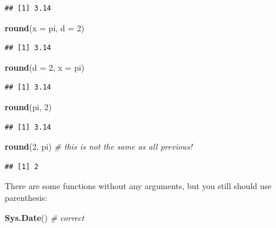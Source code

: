 \documentclass[
]{book}
\newenvironment{Shaded}{\begin{snugshade}}{\end{snugshade}}
\newcommand{\CommentTok}[1]{\textcolor[rgb]{0.56,0.35,0.01}{\textit{#1}}}
\newcommand{\DataTypeTok}[1]{\textcolor[rgb]{0.13,0.29,0.53}{#1}}
\newcommand{\DecValTok}[1]{\textcolor[rgb]{0.00,0.00,0.81}{#1}}
\newcommand{\KeywordTok}[1]{\textcolor[rgb]{0.13,0.29,0.53}{\textbf{#1}}}
\newcommand{\NormalTok}[1]{#1}
\begin{document}
\begin{verbatim}
## [1] 3.14
\end{verbatim}

\begin{Shaded}
\begin{Highlighting}[]
\KeywordTok{round}\NormalTok{(}\DataTypeTok{x =}\NormalTok{ pi, }\DataTypeTok{d =} \DecValTok{2}\NormalTok{)}
\end{Highlighting}
\end{Shaded}

\begin{verbatim}
## [1] 3.14
\end{verbatim}

\begin{Shaded}
\begin{Highlighting}[]
\KeywordTok{round}\NormalTok{(}\DataTypeTok{d =} \DecValTok{2}\NormalTok{, }\DataTypeTok{x =}\NormalTok{ pi)}
\end{Highlighting}
\end{Shaded}

\begin{verbatim}
## [1] 3.14
\end{verbatim}

\begin{Shaded}
\begin{Highlighting}[]
\KeywordTok{round}\NormalTok{(pi, }\DecValTok{2}\NormalTok{)}
\end{Highlighting}
\end{Shaded}

\begin{verbatim}
## [1] 3.14
\end{verbatim}

\begin{Shaded}
\begin{Highlighting}[]
\KeywordTok{round}\NormalTok{(}\DecValTok{2}\NormalTok{, pi) }\CommentTok{# this is not the same as all previous!}
\end{Highlighting}
\end{Shaded}

\begin{verbatim}
## [1] 2
\end{verbatim}

There are some functions without any arguments, but you still should use parenthesis:

\begin{Shaded}
\begin{Highlighting}[]
\KeywordTok{Sys.Date}\NormalTok{() }\CommentTok{# correct}
\end{Highlighting}
\end{Shaded}
\end{document}
